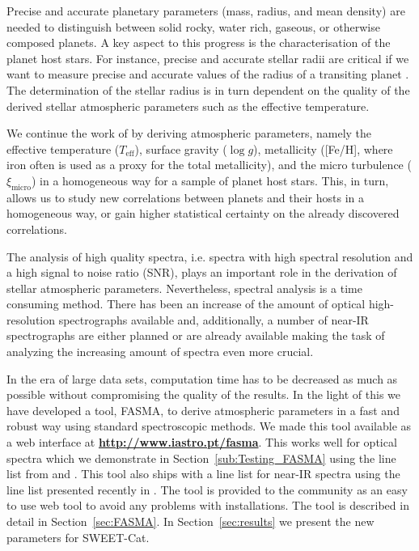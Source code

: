 \documentclass{aa}
\begin{document}
Precise and accurate planetary parameters (mass, radius, and mean density) are
needed to distinguish between solid rocky, water rich, gaseous, or otherwise
composed planets. A key aspect to this progress is the characterisation of the
planet host stars. For instance, precise and accurate stellar radii are critical
if we want to measure precise and accurate values of the radius of a transiting
planet \citep[see e.g.][]{Torres2012,Mortier2013}. The determination of the
stellar radius is in turn dependent on the quality of the derived stellar
atmospheric parameters such as the effective temperature.

We continue the work of \citet{Santos13} by deriving atmospheric parameters,
namely the effective temperature ($T_\mathrm{eff}$), surface gravity ($\log g$),
metallicity ([Fe/H], where iron often is used as a proxy for the total
metallicity), and the micro turbulence ($\xi_\mathrm{micro}$) in a homogeneous
way for a sample of planet host stars. This, in turn, allows us to study new
correlations between planets and their hosts in a homogeneous way,  or gain
higher statistical certainty on the already discovered correlations.

The analysis of high quality spectra, i.e. spectra with high spectral resolution
and a high signal to noise ratio (SNR), plays an important role in the
derivation of stellar atmospheric parameters. Nevertheless, spectral analysis is
a time consuming method. There has been an increase of the amount of  optical
high-resolution spectrographs available and, additionally, a number of near-IR
spectrographs are either planned or are already available making the task of
analyzing the increasing amount of spectra even more crucial.

In the era of large data sets, computation time has to be decreased as much as
possible without compromising the quality of the results. In the light of this
we have developed a tool, FASMA, to derive atmospheric parameters in a fast and
robust way using standard spectroscopic methods. We made this tool available as
a web interface at {\bf \url{http://www.iastro.pt/fasma}}. This works
well for optical spectra which we demonstrate in Section~\ref{sub:Testing_FASMA}
using the line list from \citet{Sousa2008a} and \citet{Tsantaki2013}. This tool
also ships with a line list for near-IR spectra using the line list presented
recently in \citet{Andreasen2016}. The tool is provided to the community as an
easy to use web tool to avoid any problems with installations. The tool is
described in detail in Section~\ref{sec:FASMA}. In Section~\ref{sec:results} we
present the new parameters for SWEET-Cat.
\end{document}
